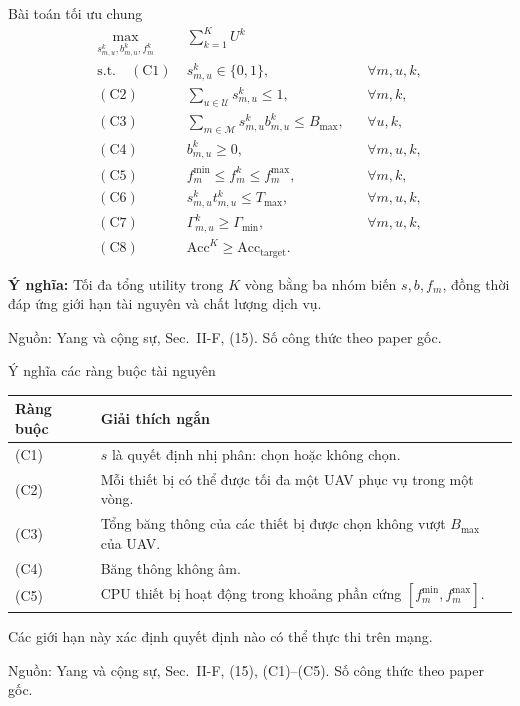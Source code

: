 \documentclass[10pt,aspectratio=43]{beamer}
\newcommand{\source}[1]{\par\vfill{\fontsize{5.8}{7}\selectfont\color{Muted}Nguồn: #1\par}}
\newcommand{\paperref}[1]{\source{Yang và cộng sự, Sec.~#1. Số công thức theo paper gốc.}}
\newcommand{\eqmeaning}[1]{\par\medskip\textcolor{HustRed}{\textbf{Ý nghĩa:}} #1\par}
\newcommand{\Acc}{\mathrm{Acc}}
\begin{document}
\begin{frame}[t]{Bài toán tối ưu chung}
\relax
{\fontsize{9}{10.5}\selectfont\setlength{\jot}{0pt}
\begin{equation}
\begin{aligned}
\max_{s_{m,u}^k,b_{m,u}^k,f_m^k}\quad &\sum_{k=1}^{K}U^k\\[-.2em]
\mathrm{s.t.}\quad
\mathrm{(C1)}\;&s_{m,u}^k\in\{0,1\},&&\forall m,u,k,\\
\mathrm{(C2)}\;&\sum_{u\in\mathcal U}s_{m,u}^k\leq1,&&\forall m,k,\\
\mathrm{(C3)}\;&\sum_{m\in\mathcal M}s_{m,u}^kb_{m,u}^k\leq B_{\max},&&\forall u,k,\\
\mathrm{(C4)}\;&b_{m,u}^k\geq0,&&\forall m,u,k,\\
\mathrm{(C5)}\;&f_m^{\min}\leq f_m^k\leq f_m^{\max},&&\forall m,k,\\
\mathrm{(C6)}\;&s_{m,u}^kt_{m,u}^k\leq T_{\max},&&\forall m,u,k,\\
\mathrm{(C7)}\;&\Gamma_{m,u}^k\geq\Gamma_{\min},&&\forall m,u,k,\\
\mathrm{(C8)}\;&\Acc^K\geq\Acc_{\mathrm{target}}.
\end{aligned}\tag{15}
\end{equation}}
\eqmeaning{Tối đa tổng utility trong $K$ vòng bằng ba nhóm biến $s,b,f_m$, đồng thời đáp ứng giới hạn tài nguyên và chất lượng dịch vụ.}
\paperref{II-F, (15)}
\end{frame}

\begin{frame}[t]{Ý nghĩa các ràng buộc tài nguyên}
\relax
\renewcommand{\arraystretch}{1.65}
\begin{tabularx}{\textwidth}{@{}>{\raggedright\arraybackslash}p{1.4cm}Y@{}}
\toprule
\textbf{Ràng buộc} & \textbf{Giải thích ngắn}\\
\midrule
(C1) & $s$ là quyết định nhị phân: chọn hoặc không chọn.\\
(C2) & Mỗi thiết bị có thể được tối đa một UAV phục vụ trong một vòng.\\
(C3) & Tổng băng thông của các thiết bị được chọn không vượt $B_{\max}$ của UAV.\\
(C4) & Băng thông không âm.\\
(C5) & CPU thiết bị hoạt động trong khoảng phần cứng $[f_m^{\min},f_m^{\max}]$.\\
\bottomrule
\end{tabularx}
\par\medskip
Các giới hạn này xác định quyết định nào có thể thực thi trên mạng.
\paperref{II-F, (15), (C1)--(C5)}
\end{frame}
\end{document}
